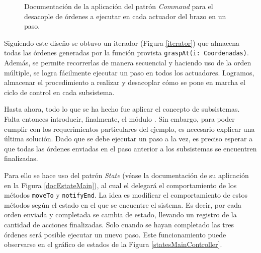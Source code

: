 \begin{figure}[H]
\caption{Documentación de la aplicación del patrón \textit{Command} para el desacople de órdenes a ejecutar en cada actuador del brazo en un paso.}
\label{docCommandSteps}
\end{figure}

Siguiendo este diseño se obtuvo un iterador (Figura \ref{iterator}) que almacena todas las órdenes generadas por la función provista \verb|graspAt(i: Coordenadas)|. Además, se permite recorrerlas de manera secuencial y haciendo uso de la orden múltiple, se logra fácilmente ejecutar un paso en todos los actuadores. Logramos, almacenar el procedimiento a realizar y desacoplar cómo se pone en marcha el ciclo de control en cada subsistema.



Hasta ahora, todo lo que se ha hecho fue aplicar el concepto de subsistemas. Falta entonces introducir, finalmente, el módulo \MainController. Sin embargo, para poder cumplir con los requerimientos particulares del ejemplo, es necesario explicar una última solución. Dado que se debe ejecutar un paso a la vez, es preciso esperar a que todas las órdenes enviadas en el paso anterior a los subsistemas se encuentren finalizadas.

Para ello se hace uso del patrón \textit{State} (véase la documentación de su aplicación en la Figura \ref{docEstateMain}), al cual el \MainController delegará el comportamiento de los métodos \verb|moveTo| y \verb|notifyEnd|. La idea es modificar el comportamiento de estos métodos según el estado en el que se encuentre el sistema. Es decir, por cada orden enviada y completada se cambia de estado, llevando un registro de la cantidad de acciones finalizadas. Solo cuando se hayan completado las tres órdenes será posible ejecutar un nuevo paso. Este funcionamiento puede observarse en el gráfico de estados de la Figura \ref{statesMainController}.

